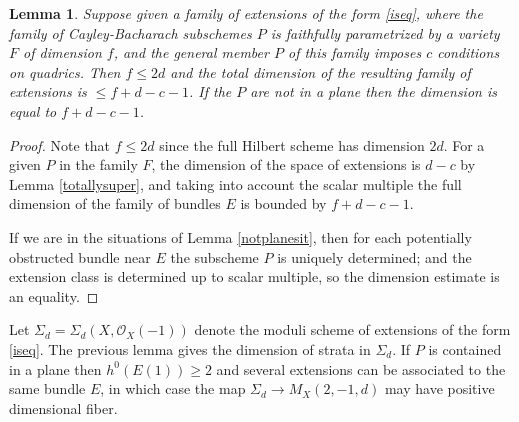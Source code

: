 \documentclass{amsart}
\theoremstyle{plain}
\newtheorem{lemma}[theorem]{Lemma}
\numberwithin{equation}{section}
\begin{document}
\begin{lemma}
\label{dimcount}
Suppose given a family of extensions of the form \eqref{iseq},
where the family of Cayley-Bacharach subschemes $P$ is faithfully parametrized by 
a variety $F$ of dimension $f$, and the general member $P$ of this
family imposes $c$ conditions on quadrics. Then $f\leq 2d$ and the total dimension
of the resulting family of extensions is $\leq f+d-c-1$. If the  $P$ are not in a plane 
then the dimension is equal to $f+d-c-1$. 
\end{lemma}
\begin{proof}
Note that $f\leq 2d$ since the full Hilbert scheme has dimension $2d$. 
For a given $P$ in the family $F$,
the dimension of the space of extensions is $d-c$ by Lemma \ref{totallysuper}, 
and taking into 
account the scalar multiple the full dimension of the family of bundles $E$
is  bounded by $f+d-c-1$.

If we are in the situations of Lemma \ref{notplanesit}, then for each 
potentially obstructed bundle near $E$ the subscheme $P$ is uniquely determined;
and the extension class is determined up to scalar multiple, so the dimension estimate
is an equality.  
\end{proof}

Let $\Sigma _d = \Sigma _d(X,{{\mathcal O}} _X(-1))$ denote the moduli scheme of extensions
of the form \eqref{iseq}. The previous lemma gives the dimension of strata in $\Sigma _d$. If $P$ is contained in a plane then $h^0(E(1))\geq 2$ and several extensions can
be associated to the same bundle $E$, in which case 
the map $\Sigma _d\rightarrow M_X(2,-1,d)$ 
may have positive dimensional fiber.
\end{document}
